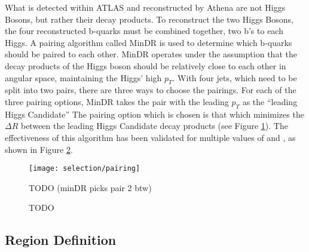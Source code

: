         What is detected within ATLAS and reconstructed by Athena are not Higgs Bosons, but rather their decay products.
        To reconstruct the two Higgs Bosons, the four reconstructed b-quarks must be combined together, two b's to each Higgs.
        A pairing algorithm called MinDR\cite{hh4b_2021_int_note}
            is used to determine which b-quarks should be paired to each other.
        MinDR operates under the assumption that the decay products of the Higgs boson
            should be relatively close to each other in angular space, maintaining the Higgs' high $p_T$.
        With four jets, which need to be split into two pairs, there are three ways to choose the pairings.
        For each of the three pairing options, MinDR takes the pair with the leading $p_T$ as the ``leading Higgs Candidate''
        The pairing option which is chosen is that which minimizes the $\Delta R$ between the leading Higgs Candidate decay products
            (see Figure \ref{fig:minDR_pairing_diagram}).
        The effectiveness of this algorithm has been validated for multiple values of \kvv and \kl,
            as shown in Figure \ref{fig:HHpairing}.

        \begin{figure}[tbh]
            \texttt{[image: selection/pairing]}
            \caption{
                TODO (minDR picks pair 2 btw)\cite{hh4b_2021_int_note}
            }
            \label{fig:minDR_pairing_diagram}
        \end{figure}

        \begin{figure}[hbt]
            \centering
            \caption{TODO \cite{hh4b_2021_int_note}}
            \label{fig:HHpairing}
        \end{figure}
                                                                                                         
        \FloatBarrier


    \subsection{Region Definition}
        
